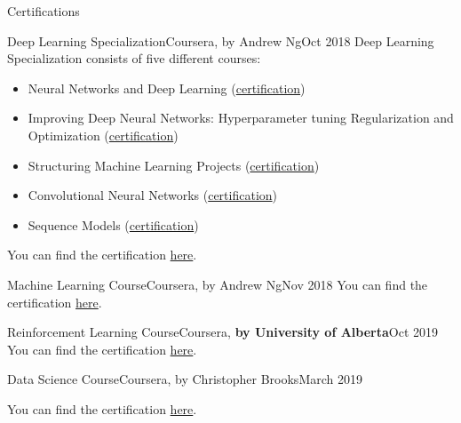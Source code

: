 \documentclass[]{mcdowellcv}
\begin{document}
    
	\begin{cvsection}{Certifications}
    		\begin{cvsubsection}{Deep Learning Specialization}{Coursera, by Andrew Ng}{Oct 2018}
                Deep Learning Specialization consists of five different courses:
    			\begin{itemize}
                \item Neural Networks and Deep Learning (\href{https://www.coursera.org/account/accomplishments/certificate/Q466THNX9825}{certification})
                \item Improving Deep Neural Networks: Hyperparameter tuning Regularization and Optimization (\href{https://www.coursera.org/account/accomplishments/verify/BKWJS632W3V8}{certification})
    			\item Structuring Machine Learning Projects (\href{https://www.coursera.org/account/accomplishments/certificate/UEF3FJTFZSFD}{certification})
    			\item Convolutional Neural Networks (\href{https://www.coursera.org/account/accomplishments/certificate/MEWWQGYXJX2M}{certification})
    			\item Sequence Models (\href{https://www.coursera.org/account/accomplishments/certificate/RDANP785FVS6}{certification})
    			\end{itemize}
    			You can find the certification \href{https://www.coursera.org/account/accomplishments/specialization/certificate/XCRZ9PFYVLNH}{here}.
    		\end{cvsubsection}
    		
    		\begin{cvsubsection}{Machine Learning Course}{Coursera, by Andrew Ng}{Nov 2018}
                You can find the certification \href{https://www.coursera.org/account/accomplishments/verify/JN6PYQVTHEGB}{here}.
    		\end{cvsubsection}
    		
			\begin{cvsubsection}{Reinforcement Learning Course}{Coursera, \textbf{by University of Alberta}}{Oct 2019}
            You can find the certification \href{https://www.coursera.org/account/accomplishments/verify/XXEYSHY47YW9}{here}.
    		\end{cvsubsection}
    		
    		\begin{cvsubsection}{Data Science Course}{Coursera, by Christopher Brooks}{March 2019} 
    		    
                You can find the certification \href{https://www.coursera.org/account/accomplishments/verify/CMAYYDRR3XG4}{here}.
    		\end{cvsubsection}
    		

\end{cvsection}
\end{document}
